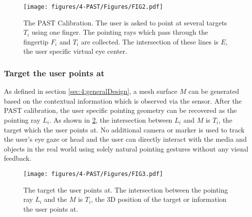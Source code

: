 \begin{figure} 
	\centering
	\texttt{[image: figures/4-PAST/Figures/FIG2.pdf]}
	\caption{The PAST Calibration. The user is asked to point at several targets $T_i$ using one finger. The pointing rays which pass through the fingertip $F_i$ and $T_i$ are collected. The intersection of these lines is $E$, the user specific virtual eye center.}
	\label{fig:past:calibration}
\end{figure}
\subsubsection{Target the user points at} \label{sec:4:findTarget}
As defined in section \ref{sec:4:generalDesign}, {a mesh surface $M$ can be generated based on the contextual information which is observed via the sensor.}
After the PAST calibration, the user specific pointing geometry can be recovered as the pointing ray $L_{i}$. 
As shown in \figurename{ \ref{fig:pointToTarget}}, the intersection between $L_{i}$ and $M$ is $T_i$, the target which the user points at. No additional camera or marker is used to track the user's eye gaze or head and the user can directly interact with the media and objects in the real world using solely natural pointing gestures without any visual feedback. 
\begin{figure} 
	\centering
	\texttt{[image: figures/4-PAST/Figures/FIG3.pdf]}
	\caption{The target the user points at. The intersection between the pointing ray $L_{i}$ and the $M$ is $T_i$, the 3D position of the target or information the user points at.}
	\label{fig:pointToTarget}
\end{figure}
